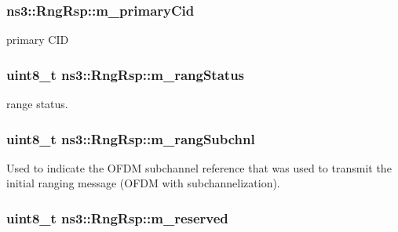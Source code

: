 \subsubsection[{\texorpdfstring{m\+\_\+primary\+Cid}{m_primaryCid}}]{ ns3\+::\+Rng\+Rsp\+::m\+\_\+primary\+Cid\hspace{0.3cm}{\ttfamily [private]}}\hypertarget{classns3_1_1RngRsp_a1d1e06445b45d170b7f8b5ed67631bcf}{}\label{classns3_1_1RngRsp_a1d1e06445b45d170b7f8b5ed67631bcf}


primary C\+ID 

\subsubsection[{\texorpdfstring{m\+\_\+rang\+Status}{m_rangStatus}}]{\setlength{\rightskip}{0pt plus 5cm}uint8\+\_\+t ns3\+::\+Rng\+Rsp\+::m\+\_\+rang\+Status\hspace{0.3cm}{\ttfamily [private]}}\hypertarget{classns3_1_1RngRsp_a47662e9c2019c4b84d6fe0f15405136e}{}\label{classns3_1_1RngRsp_a47662e9c2019c4b84d6fe0f15405136e}
range status. 
\subsubsection[{\texorpdfstring{m\+\_\+rang\+Subchnl}{m_rangSubchnl}}]{\setlength{\rightskip}{0pt plus 5cm}uint8\+\_\+t ns3\+::\+Rng\+Rsp\+::m\+\_\+rang\+Subchnl\hspace{0.3cm}{\ttfamily [private]}}\hypertarget{classns3_1_1RngRsp_a808afa245b6051da1b72678a42916ae3}{}\label{classns3_1_1RngRsp_a808afa245b6051da1b72678a42916ae3}
Used to indicate the O\+F\+DM subchannel reference that was used to transmit the initial ranging message (O\+F\+DM with subchannelization). 
\subsubsection[{\texorpdfstring{m\+\_\+reserved}{m_reserved}}]{\setlength{\rightskip}{0pt plus 5cm}uint8\+\_\+t ns3\+::\+Rng\+Rsp\+::m\+\_\+reserved\hspace{0.3cm}{\ttfamily [private]}}\hypertarget{classns3_1_1RngRsp_ac2b0e49e6b52d0e0050d2e35ad97e58b}{}\label{classns3_1_1RngRsp_ac2b0e49e6b52d0e0050d2e35ad97e58b}



